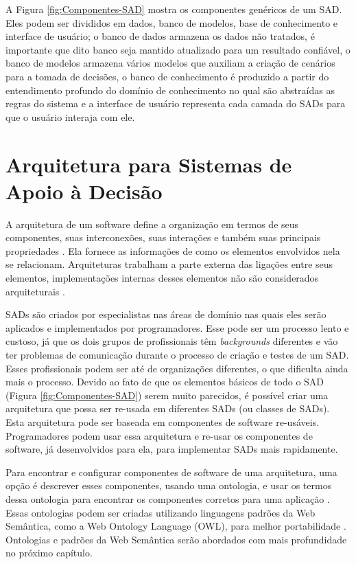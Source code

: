 A Figura \ref{fig:Componentes-SAD} mostra os componentes genéricos
de um SAD. Eles podem ser divididos em dados, banco de modelos, base
de conhecimento e interface de usuário; o banco de dados armazena
os dados não tratados, é importante que dito banco seja mantido atualizado
para um resultado confiável, o banco de modelos armazena vários modelos
que auxiliam a criação de cenários para a tomada de decisões, o banco
de conhecimento é produzido a partir do entendimento profundo do domínio
de conhecimento no qual são abstraídas as regras do sistema e a interface
de usuário representa cada camada do SADs para que o usuário interaja
com ele.

\section{Arquitetura para Sistemas de Apoio à Decisão}

A arquitetura de um software define a organização em termos de seus
componentes, suas interconexões, suas interações e também suas principais
propriedades \citet{de1997software}. Ela fornece as informações de
como os elementos envolvidos nela se relacionam. Arquiteturas trabalham
a parte externa das ligações entre seus elementos, implementações
internas desses elementos não são considerados arquiteturais \citet{sei2006architecture}.

SADs são criados por especialistas nas áreas de domínio nas quais
eles serão aplicados e implementados por programadores. Esse pode
ser um processo lento e custoso, já que os dois grupos de profissionais
têm \foreignlanguage{english}{\emph{backgrounds}} diferentes e vão
ter problemas de comunicação durante o processo de criação e testes
de um SAD. Esses profissionais podem ser até de organizações diferentes,
o que dificulta ainda mais o processo. Devido ao fato de que os elementos
básicos de todo o SAD (Figura \ref{fig:Componentes-SAD}) serem muito
parecidos, é possível criar uma arquitetura que possa ser re\nobreakdash-usada
em diferentes SADs (ou classes de SADs). Esta arquitetura pode ser
baseada em componentes de software re\nobreakdash-usáveis. Programadores
podem usar essa arquitetura e re\nobreakdash-usar os componentes
de software, já desenvolvidos para ela, para implementar SADs mais
rapidamente.

Para encontrar e configurar componentes de software de uma arquitetura,
uma opção é descrever esses componentes, usando uma ontologia, e usar
os termos dessa ontologia para encontrar os componentes corretos para
uma aplicação \citet{Linhalis2010}. Essas ontologias podem ser criadas
utilizando linguagens padrões da Web Semântica, como a Web Ontology
Language (OWL), para melhor
portabilidade \citet{Pahl2007}. Ontologias e padrões da Web Semântica
serão abordados com mais profundidade no próximo capítulo.

